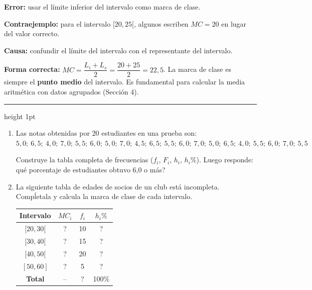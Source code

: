 \documentclass[11pt, letterpaper]{article}
\newcommand{\subbloque}[1]{%
  \vspace{14pt}
  \noindent{\large\bfseries\color{zenitnavy} #1}\par
  \vspace{4pt}\hrule height 1pt\vspace{8pt}}
\begin{document}
\begin{tcolorbox}[warningbox, title={Error frecuente: no calcular correctamente la marca de clase}]
\textbf{Error:} usar el l\'imite inferior del intervalo como marca de clase.

\medskip
\textbf{Contraejemplo:} para el intervalo $[20, 25[$, algunos escriben $MC = 20$ en lugar del valor correcto.

\medskip
\textbf{Causa:} confundir el l\'imite del intervalo con el representante del intervalo.

\medskip
\textbf{Forma correcta:} $MC = \dfrac{L_i + L_s}{2} = \dfrac{20 + 25}{2} = 22{,}5$. La marca de clase es siempre el \textbf{punto medio} del intervalo. Es fundamental para calcular la media aritm\'etica con datos agrupados (Secci\'on 4).
\end{tcolorbox}

\subbloque{Pr\'actica inmediata 2}

\begin{enumerate}[label=\textbf{\arabic*.}, leftmargin=*]
  \item Las notas obtenidas por 20 estudiantes en una prueba son:
  $5{,}0;\ 6{,}5;\ 4{,}0;\ 7{,}0;\ 5{,}5;\ 6{,}0;\ 5{,}0;\ 7{,}0;\ 4{,}5;\ 6{,}5;\ 5{,}5;\ 6{,}0;\ 7{,}0;\ 5{,}0;\ 6{,}5;\ 4{,}0;\ 5{,}5;\ 6{,}0;\ 7{,}0;\ 5{,}5$

  Construye la tabla completa de frecuencias ($f_i$, $F_i$, $h_i$, $h_i\%$). Luego responde: \textquestiondown qu\'e porcentaje de estudiantes obtuvo 6{,}0 o m\'as?

  \item La siguiente tabla de edades de socios de un club est\'a incompleta. Comp\'letala y calcula la marca de clase de cada intervalo.
  \begin{center}
  \renewcommand{\arraystretch}{1.3}
  \begin{tabular}{c c c c}
  \toprule
  Intervalo & $MC_i$ & $f_i$ & $h_i\%$\\
  \midrule
  $[20,30[$ & ? & 10 & ?\\
  $[30,40[$ & ? & 15 & ?\\
  $[40,50[$ & ? & 20 & ?\\
  $[50,60]$ & ? & 5  & ?\\
  \midrule
  \textbf{Total} & -- & ? & 100\%\\
  \bottomrule
  \end{tabular}
  \end{center}
\end{enumerate}
\end{document}
